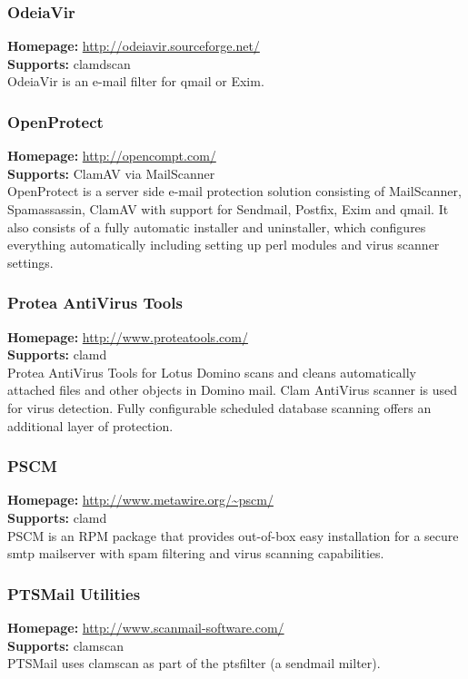 \documentclass[a4paper,titlepage,12pt]{article}
\begin{document}
    \subsubsection{OdeiaVir}
    \textbf{Homepage:} \url{http://odeiavir.sourceforge.net/}\\
    \textbf{Supports:} clamdscan\\[4pt]
    OdeiaVir is an e-mail filter for qmail or Exim.

    \subsubsection{OpenProtect}
    \textbf{Homepage:} \url{http://opencompt.com/}\\
    \textbf{Supports:} ClamAV via MailScanner\\[4pt]
    OpenProtect is a server side e-mail protection solution consisting of
    MailScanner, Spamassassin, ClamAV with support for Sendmail, Postfix,
    Exim and qmail. It also consists of a fully automatic installer and
    uninstaller, which configures everything automatically including
    setting up perl modules and virus scanner settings. 

    \subsubsection{Protea AntiVirus Tools}
    \textbf{Homepage:} \url{http://www.proteatools.com/}\\
    \textbf{Supports:} clamd\\[4pt]
    Protea AntiVirus Tools for Lotus Domino scans and cleans automatically
    attached files and other objects in Domino mail. Clam AntiVirus scanner
    is used for virus detection. Fully configurable scheduled database scanning
    offers an additional layer of protection.

    \subsubsection{PSCM}
    \textbf{Homepage:} \url{http://www.metawire.org/~pscm/}\\
    \textbf{Supports:} clamd\\[4pt]
    PSCM is an RPM package that provides out-of-box easy installation for
    a secure smtp mailserver with spam filtering and virus scanning
    capabilities.

    \subsubsection{PTSMail Utilities}
    \textbf{Homepage:} \url{http://www.scanmail-software.com/}\\
    \textbf{Supports:} clamscan\\[4pt]
    PTSMail uses clamscan as part of the ptsfilter (a sendmail milter).
\end{document}
